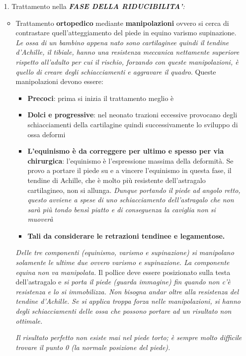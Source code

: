 \begin{itemize}
\item[1.]
  Trattamento nella \emph{\textbf{FASE DELLA RIDUCIBILITA'}:}
	\begin{itemize}
\item
  Trattamento \textbf{ortopedico} mediante \textbf{manipolazioni} ovvero si cerca di contrastare quell'atteggiamento del piede in equino varismo supinazione. \emph{Le ossa di un bambino appena nato sono cartilaginee quindi il tendine d'Achille, il tibiale, hanno una resistenza meccanica nettamente superiore rispetto all'adulto per cui il rischio, forzando con queste manipolazioni, è quello di creare degli schiacciamenti e aggravare il quadro}. Queste manipolazioni devono essere:
		\begin{itemize}
\item
 \textbf{Precoci}: prima si inizia il trattamento meglio è
\item
  \textbf{Dolci e progressive}: nel neonato trazioni eccessive provocano degli schiacciamenti della cartilagine quindi successivamente lo sviluppo di ossa deformi
\item
  \textbf{L'equinismo è da correggere per ultimo e spesso per via chirurgica}: l'equinismo è l'espressione massima della deformità. Se provo a portare il piede su e a vincere l'equinismo in questa fase, il tendine di Achille, che è molto più resistente dell'astragalo cartilagineo, non si allunga. \emph{Dunque portando il piede ad angolo retto, questo avviene a spese di uno schiacciamento dell'astragalo che non sarà più tondo bensì piatto e di conseguenza la caviglia non si muoverà}
\item
  \textbf{Tali da considerare le retrazioni tendinee e legamentose.}
		\end{itemize}

\emph{Delle tre componenti (equinismo, varismo e supinazione) si manipolano solamente le ultime due ovvero varismo e supinazione. La componente equina non va manipolata.} Il pollice deve essere posizionato sulla testa dell'astragalo e \emph{si porta il piede (guarda immagine) fin quando non c'è resistenza e lo si immobilizza. Non bisogna andar oltre alla resistenza del tendine d'Achille. Se si applica troppa forza nelle manipolazioni, si hanno degli schiacciamenti delle ossa che possono portare ad un risultato non ottimale. }

\emph{Il risultato perfetto non esiste mai nel piede torto; è sempre molto difficile trovare il punto 0 (la normale posizione del piede).}


\end{itemize}
\end{itemize}
